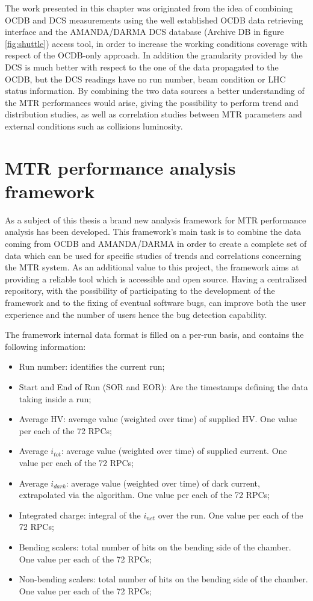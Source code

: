The work presented in this chapter was originated from the idea of combining OCDB and DCS measurements using the well established OCDB data retrieving interface and the AMANDA/DARMA DCS database (Archive DB in figure \ref{fig:shuttle}) access tool, in order to increase the working conditions coverage with respect of the OCDB-only approach.
In addition the granularity provided by the DCS is much better with respect to the one of the data propagated to the OCDB, but the DCS readings have no run number, beam condition or LHC status information.
By combining the two data sources a better understanding of the MTR performances would arise, giving the possibility to perform trend and distribution studies, as well as correlation studies between MTR parameters and external conditions such as collisions luminosity.

\section{MTR performance analysis framework}
As a subject of this thesis a brand new analysis framework for MTR performance analysis has been developed.
This framework's main task is to combine the data coming from OCDB and AMANDA/DARMA in order to create a complete set of data which can be used for specific studies of trends and correlations concerning the MTR system.
As an additional value to this project, the framework aims at providing a reliable tool which is accessible and open source.
Having a centralized repository, with the possibility of participating to the development of the framework and to the fixing of eventual software bugs, can improve both the user experience and the number of users hence the bug detection capability.

The framework internal data format is filled on a per-run basis, and contains the following information:
\begin{itemize}
\item Run number: identifies the current run;
\item Start and End of Run (SOR and EOR): Are the timestamps defining the data taking inside a run;
\item Average HV: average value (weighted over time) of supplied HV. One value per each of the 72 RPCs;
\item Average $i_{tot}$: average value (weighted over time) of supplied current.  One value per each of the 72 RPCs;
\item Average $i_{dark}$: average value (weighted over time) of dark current, extrapolated via the algorithm.  One value per each of the 72 RPCs;
\item Integrated charge: integral of the $i_{net}$ over the run.  One value per each of the 72 RPCs;
\item Bending scalers: total number of hits on the bending side of the chamber.  One value per each of the 72 RPCs;
\item Non-bending scalers: total number of hits on the bending side of the chamber.  One value per each of the 72 RPCs;
\end{itemize}

